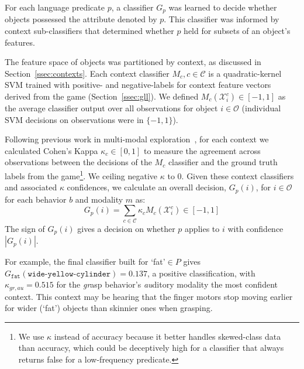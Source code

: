 For each language predicate $p$, a classifier $G_p$ was learned to decide whether objects possessed the attribute denoted by $p$.
This classifier was informed by context sub-classifiers that determined whether $p$ held for subsets of an object's features.

The feature space of objects was partitioned by context, as discussed in Section~\ref{ssec:contexts}.
Each context classifier $M_{c}, c\in\mathcal{C}$ is a quadratic-kernel SVM trained with positive- and negative-labels for context feature vectors derived from the \ispy game (Section~\ref{ssec:gll}).
We defined $M_{c}(\mathcal{X}_i^c)\in [-1,1]$ as the average classifier output over all observations for object $i\in\mathcal{O}$ (individual SVM decisions on observations were in $\{-1,1\}$).

Following previous work in multi-modal exploration~\cite{sinapov:icra14}, for each context we calculated Cohen's Kappa $\kappa_{c}\in[0,1]$ to measure the agreement across observations between the decisions of the $M_{c}$ classifier and the ground truth labels from the \ispy game\footnote{We use $\kappa$ instead of accuracy because it better handles skewed-class data than accuracy, which could be deceptively high for a classifier that always returns false for a low-frequency predicate.}.
We ceiling negative $\kappa$ to $0$.
Given these context classifiers and associated $\kappa$ confidences, we calculate an overall decision, $G_p(i)$, for $i\in\mathcal{O}$ for each behavior $b$ and modality $m$ as:
\begin{equation}
	G_p(i) = \sum_{c\in\mathcal{C}}{\kappa_{c} M_{c}(\mathcal{X}_i^c)} \in [-1,1]
\end{equation}
The sign of $G_p(i)$ gives a decision on whether $p$ applies to $i$ with confidence $|G_p(i)|$.

For example, the final classifier built for `fat'$\in P$ gives $G_{\texttt{fat}}(\texttt{wide-yellow-cylinder}) = 0.137$, a positive classification, with $\kappa_{gr,au}=0.515$ for the \textit{gr}asp behavior's \textit{au}ditory modality the most confident context. This context may be hearing that the finger motors stop moving earlier for wider (`fat') objects than skinnier ones when grasping.